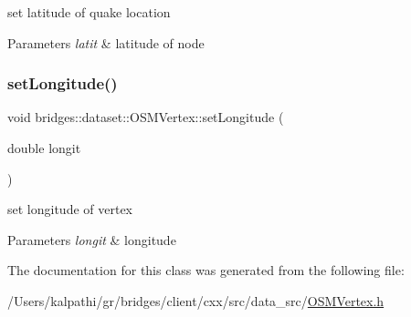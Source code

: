 set latitude of quake location


\begin{DoxyParams}{Parameters}
{\em latit} & latitude of node \\
\hline
\end{DoxyParams}
\mbox{\label{classbridges_1_1dataset_1_1_o_s_m_vertex_a48e077133233ba705342ba955c6fdc23}} 
\subsubsection{\texorpdfstring{set\+Longitude()}{setLongitude()}}
{\footnotesize\ttfamily void bridges\+::dataset\+::\+O\+S\+M\+Vertex\+::set\+Longitude (\begin{DoxyParamCaption}\item[{double}]{longit }\end{DoxyParamCaption})\hspace{0.3cm}{\ttfamily [inline]}}

set longitude of vertex


\begin{DoxyParams}{Parameters}
{\em longit} & longitude \\
\hline
\end{DoxyParams}


The documentation for this class was generated from the following file\+:\begin{DoxyCompactItemize}
\item 
/\+Users/kalpathi/gr/bridges/client/cxx/src/data\+\_\+src/\mbox{\hyperlink{_o_s_m_vertex_8h}{O\+S\+M\+Vertex.\+h}}\end{DoxyCompactItemize}
